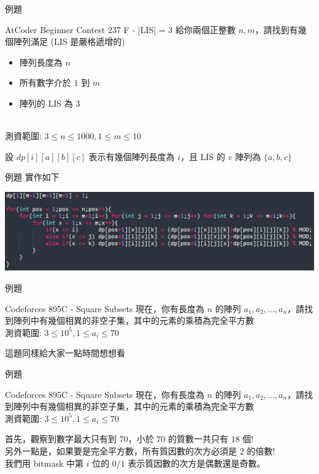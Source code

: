 \documentclass[aspectratio=169]{beamer}
\begin{document}
\begin{frame}{例題}
    \begin{block}{AtCoder Beginner Contest 237 F - |LIS| = 3}
        給你兩個正整數 $n,m$，請找到有幾個陣列滿足 (LIS 是嚴格遞增的)
        \begin{itemize}
            \item 陣列長度為 $n$
            \item 所有數字介於 $1$ 到 $m$
            \item 陣列的 LIS 為 $3$
        \end{itemize} \\ 
        \vspace{5mm}
        測資範圍: $3 \le n \le 1000, 1 \le m \le 10$
    \end{block} 
    設 $dp[i][a][b][c]$ 表示有幾個陣列長度為 $i$，且 LIS 的 $v$ 陣列為 $\{a,b,c\}$ 
\end{frame}

\begin{frame}[fragile]{例題}
    實作如下
    \begin{center}
        \includegraphics[scale=0.5]{images/LIS is three.png}
    \end{center}
\end{frame}

\begin{frame}{例題}
    \begin{block}{Codeforces 895C - Square Subsets}
        現在，你有長度為 $n$ 的陣列 $a_1,a_2,\dots,a_n$，請找到陣列中有幾個相異的非空子集，其中的元素的乘積為完全平方數\\ 
        \vspace{5mm}
        測資範圍: $3 \le 10^5, 1 \le a_i \le 70$
    \end{block} \pause
    這題同樣給大家一點時間想想看
\end{frame}

\begin{frame}{例題}
    \begin{block}{Codeforces 895C - Square Subsets}
        現在，你有長度為 $n$ 的陣列 $a_1,a_2,\dots,a_n$，請找到陣列中有幾個相異的非空子集，其中的元素的乘積為完全平方數\\ 
        \vspace{5mm}
        測資範圍: $3 \le 10^5, 1 \le a_i \le 70$
    \end{block} 
    首先，觀察到數字最大只有到 $70$，小於 $70$ 的質數一共只有 $18$ 個! \\
    另外一點是，如果要是完全平方數，所有質因數的次方必須是 $2$ 的倍數! \\
    我們用 bitmask 中第 $i$ 位的 $0/1$ 表示質因數的次方是偶數還是奇數。
\end{frame}
\end{document}
